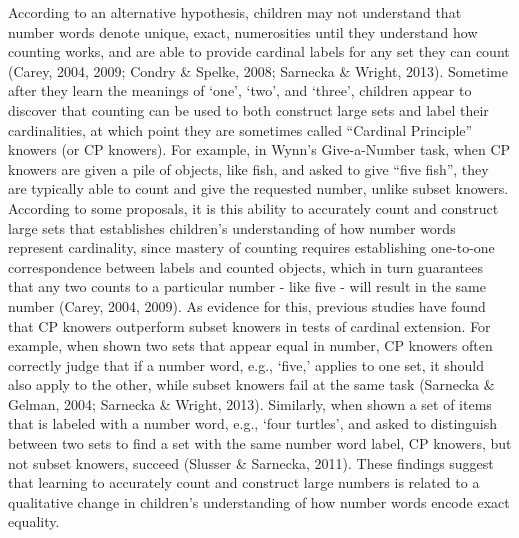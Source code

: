 \documentclass[
  man,floatsintext]{apa7}
\begin{document}
According to an alternative hypothesis, children may not understand that number words denote unique, exact, numerosities until they understand how counting works, and are able to provide cardinal labels for any set they can count (Carey, 2004, 2009; Condry \& Spelke, 2008; Sarnecka \& Wright, 2013). Sometime after they learn the meanings of `one', `two', and `three', children appear to discover that counting can be used to both construct large sets and label their cardinalities, at which point they are sometimes called ``Cardinal Principle'' knowers (or CP knowers). For example, in Wynn's Give-a-Number task, when CP knowers are given a pile of objects, like fish, and asked to give ``five fish'', they are typically able to count and give the requested number, unlike subset knowers. According to some proposals, it is this ability to accurately count and construct large sets that establishes children's understanding of how number words represent cardinality, since mastery of counting requires establishing one-to-one correspondence between labels and counted objects, which in turn guarantees that any two counts to a particular number - like five - will result in the same number (Carey, 2004, 2009). As evidence for this, previous studies have found that CP knowers outperform subset knowers in tests of cardinal extension. For example, when shown two sets that appear equal in number, CP knowers often correctly judge that if a number word, e.g., `five,' applies to one set, it should also apply to the other, while subset knowers fail at the same task (Sarnecka \& Gelman, 2004; Sarnecka \& Wright, 2013). Similarly, when shown a set of items that is labeled with a number word, e.g., `four turtles', and asked to distinguish between two sets to find a set with the same number word label, CP knowers, but not subset knowers, succeed (Slusser \& Sarnecka, 2011). These findings suggest that learning to accurately count and construct large numbers is related to a qualitative change in children's understanding of how number words encode exact equality.
\end{document}
